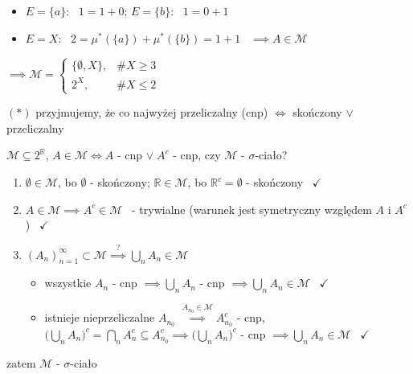 \documentclass[a4paper,12pt]{article}
\begin{document}
\begin{podpunkty}
\begin{itemize}
\begin{itemize}
\begin{itemize}
                \item \(E = \{a\}\): \, \(1 = 1 + 0\); \;\; \(E = \{b\}\): \, \(1 = 0 + 1\)
                \item \(E = X\): \, \(2 = \mu^*(\{a\}) + \mu^*(\{b\}) = 1 + 1\) \, \(\implies A \in \mathcal{M}\)
            \end{itemize}
        \end{itemize}
        \(\implies \mathcal{M} = \begin{cases} \{\emptyset, X\}, & \#X \geq 3 \\ 2^X, & \#X \leq 2 \end{cases}\)
    \end{itemize}
\end{podpunkty}

\bigskip
\((*)\) \; przyjmujemy, że co najwyżej przeliczalny (cnp) \(\iff\) skończony \(\lor\) przeliczalny

\bigskip
{} \; \(\mathcal{M} \subseteq 2^{\mathbb{R}}\), \; \(A \in \mathcal{M} \iff A\) - cnp \(\lor \; A^c\) - cnp, \; czy \(\mathcal{M}\) - \(\sigma\)-ciało?
\begin{enumerate}[label=\roman*), leftmargin=1.9em, itemsep=0.2em, topsep=0.2em, parsep=0pt, partopsep=0pt]
    \item \(\emptyset \in \mathcal{M}\), bo \(\emptyset\) - skończony; \; \(\mathbb{R} \in \mathcal{M}\), bo \(\mathbb{R}^c = \emptyset\) - skończony \, \(\checkmark\)
    \item \(A \in \mathcal{M} \implies A^c \in \mathcal{M}\) \, - trywialne (warunek jest symetryczny względem \(A\) i \(A^c\)) \, \(\checkmark\)
    \item \((A_n)_{n=1}^{\infty} \subset \mathcal{M} \overset{?}{\implies} \bigcup_n A_n \in \mathcal{M}\)
    \begin{itemize}
        \item[\(1^\circ\)] wszystkie \(A_n\) - cnp \(\implies \bigcup_n A_n\) - cnp \(\implies \bigcup_n A_n \in \mathcal{M}\) \, \(\checkmark\)
        \item[\(2^\circ\)] istnieje nieprzeliczalne \(A_{n_0}\) \(\overset{A_{n_0} \in \mathcal{M}}{\implies} A_{n_0}^c\) - cnp, \; \(\big(\bigcup_n A_n\big)^c = \bigcap_n A_n^c \subseteq A_{n_0}^c \implies \big(\bigcup_n A_n\big)^c\) - cnp \(\implies \bigcup_n A_n \in \mathcal{M}\) \, \(\checkmark\)
    \end{itemize}
\end{enumerate}
zatem \(\mathcal{M}\) - \(\sigma\)-ciało
\end{document}
